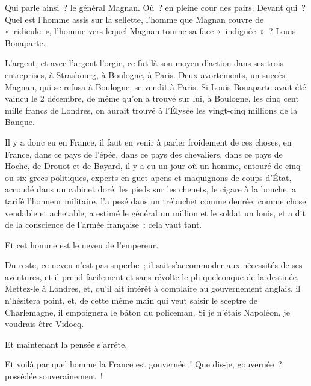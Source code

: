 \documentclass[french,twoside]{book} %
\begin{document}
\noindent Qui parle ainsi ? le général Magnan. Où ? en pleine cour des pairs. Devant qui ? Quel est l’homme assis sur la sellette, l’homme que Magnan couvre de « ridicule », l’homme vers lequel Magnan tourne sa face « indignée » ? Louis Bonaparte.\par
L’argent, et avec l’argent l’orgie, ce fut là son moyen d’action dans ses trois entreprises, à Strasbourg, à Boulogne, à Paris. Deux avortements, un succès. Magnan, qui se refusa à Boulogne, se vendit à Paris. Si Louis Bonaparte avait été vaincu le 2 décembre, de même qu’on a trouvé sur lui, à Boulogne, les cinq cent mille francs de Londres, on aurait trouvé à l’Élysée les vingt-cinq millions de la Banque.\par
Il y a donc eu en France, il faut en venir à parler froidement de ces choses, en France, dans ce pays de l’épée, dans ce pays des chevaliers, dans ce pays de Hoche, de Drouot et de Bayard, il y a eu un jour où un homme, entouré de cinq ou six grecs politiques, experts en guet-apens et maquignons de coups d’État, accoudé dans un cabinet doré, les pieds sur les chenets, le cigare à la bouche, a tarifé l’honneur militaire, l’a pesé dans un trébuchet comme denrée, comme chose vendable et achetable, a estimé le général un million et le soldat un louis, et a dit de la conscience de l’armée française : cela vaut tant.\par
Et cet homme est le neveu de l’empereur.\par
Du reste, ce neveu n’est pas superbe ; il sait s’accommoder aux nécessités de ses aventures, et il prend facilement et sans révolte le pli quelconque de la destinée. Mettez-le à Londres, et, qu’il ait intérêt à complaire au gouvernement anglais, il n’hésitera point, et, de cette même main qui veut saisir le sceptre de Charlemagne, il empoignera le bâton du policeman. Si je n’étais Napoléon, je voudrais être Vidocq.\par
Et maintenant la pensée s’arrête.\par
Et voilà par quel homme la France est gouvernée ! Que dis-je, gouvernée ? possédée souverainement !\par
\end{document}
